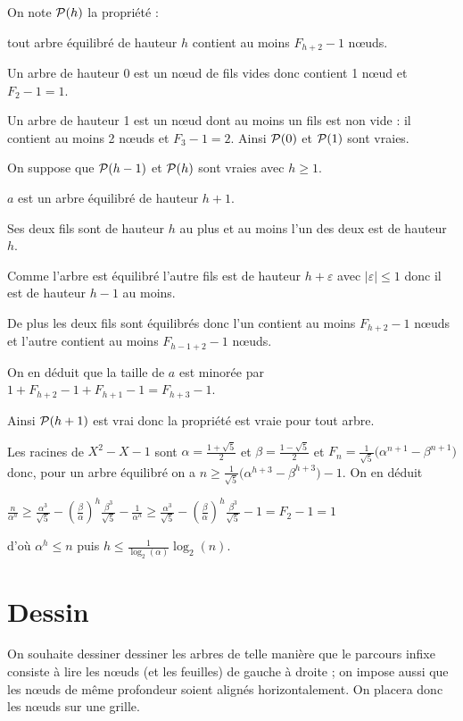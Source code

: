 \begin{Answer}
On note ${\cal P}(h)$ la propriété :

 tout arbre équilibré de hauteur $h$ contient au moins $F_{h+2}-1$ nœuds.

Un arbre de hauteur 0 est un nœud de fils vides donc contient 1 nœud et $F_2-1=1$.

Un arbre de hauteur 1 est un nœud dont au moins un fils est non vide : il contient au moins 2 nœuds et $F_3-1=2$.
Ainsi ${\cal P}(0)$ et ${\cal P}(1)$ sont vraies.

On suppose que ${\cal P}(h-1)$ et ${\cal P}(h)$ sont vraies avec $h\ge 1$.

$a$ est un arbre équilibré de hauteur $h+1$.

Ses deux fils sont de hauteur $h$ au plus et au moins l'un des deux est de hauteur $h$.

Comme l'arbre est équilibré l'autre fils est de hauteur $h+\varepsilon$ avec $|\varepsilon| \le 1$ donc il est de hauteur $h-1$ au moins.

De plus les deux fils sont équilibrés donc l'un contient au moins $F_{h+2}-1$ nœuds et l'autre contient au moins $F_{h-1+2}-1$ nœuds. 

On en déduit que la taille de $a$ est minorée par $1+F_{h+2}-1+F_{h+1}-1=F_{h+3}-1$.

Ainsi ${\cal P}(h+1)$ est vrai donc la propriété est vraie pour tout arbre.

\medskip


Les racines de $X^2-X-1$ sont $\alpha=\frac{1+\sqrt 5}2$ et $\beta=\frac{1-\sqrt 5}2$ et $F_n=\frac 1{\sqrt 5}\bigl(\alpha^{n+1}-\beta^{n+1}\bigr)$ donc, pour un arbre équilibré on a $n \ge \frac 1{\sqrt 5}\bigl(\alpha^{h+3}-\beta^{h+3}\bigr)-1$. On en déduit

$\displaystyle \frac n{\alpha^h} \ge \frac {\alpha^3}{\sqrt 5}-\left(\frac \beta\alpha\right)^h\frac {\beta^3}{\sqrt 5}-\frac 1{\alpha^h}\ge  \frac {\alpha^3}{\sqrt 5}-\left(\frac \beta\alpha\right)^h\frac {\beta^3}{\sqrt 5}-1=F_2-1=1$

d'où $\alpha^h\le n$ puis $\displaystyle h \le \frac 1{\log_2(\alpha)}\log_2(n)$.
\end{Answer}
\section{Dessin}
On souhaite  dessiner dessiner les arbres de telle manière que le parcours infixe consiste à lire les nœuds (et les feuilles)  de gauche à droite ; on impose aussi que les nœuds de même profondeur soient alignés horizontalement. On placera donc les nœuds sur une grille.

